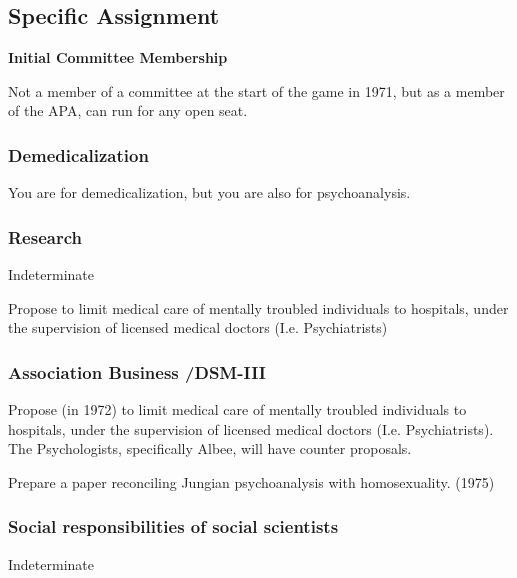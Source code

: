 \begin{refsection}
\subsection{Specific Assignment}
\label{specificassignment}

\textbf{Initial Committee Membership}

Not a member of a committee at the start of the game in 1971, but as a member of the APA, can run for any open seat.

\subsubsection{Demedicalization}
\label{demedicalization}

You are for demedicalization, but you are also for psychoanalysis.

\subsubsection{Research}
\label{research}

Indeterminate
\begin{proposal}[Hopcke]\label{proposal:hopcke}
Propose to limit medical care of mentally troubled individuals to hospitals, under the supervision of licensed medical doctors (I.e. Psychiatrists)
\end{proposal}

\subsubsection{Association Business \slash  DSM-III}
\label{associationbusinessdsm-iii}

Propose (in 1972) to limit medical care of mentally troubled individuals to hospitals, under the supervision of licensed medical doctors (I.e. Psychiatrists). The Psychologists, specifically Albee, will have counter proposals.
\begin{writingtask}[Hopcke]\label{writingtask:hopcke}
Prepare a paper reconciling Jungian psychoanalysis with homosexuality. (1975)
\end{writingtask}

\subsubsection{Social responsibilities of social scientists}
\label{socialresponsibilitiesofsocialscientists}

Indeterminate


\end{refsection}
